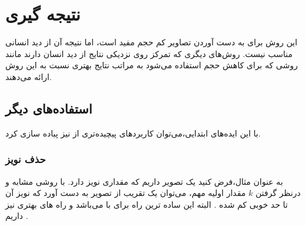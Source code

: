 \chapter{نتیجه گیری}
این روش برای به دست ‌آوردن تصاویر کم حجم مفید است، اما  نتیجه آن از دید انسانی مناسب نیست.
روش‌های دیگری که تمرکز روی نزدیکی نتایج از دید انسان دارند مانند روشی که برای کاهش حجم
استفاده می‌شود
به مراتب نتایج بهتری نسبت به این روش ارائه می‌دهند.

\section{استفاده‌های دیگر}
با این ایده‌های ابتدایی،‌می‌‌توان کاربرد‌های پیچیده‌تری از
نیز پباده سازی کرد.

\subsection{حذف نویز}

به عنوان مثال،‌فرض کنید یک تصویر داریم که مقداری نویز دارد.
با روشی مشابه و درنظر گرفتن
$k$
مقدار اولیه مهم، می‌توان یک تقریب از تصویر به دست آورد که نویز آن تا حد خوبی کم شده
\cite{7067415}
.
البته این ساده ترین راه برای
با
می‌باشد و راه ‌های بهتری نیز داریم
\cite{10.1007/978-3-030-32456-8_43}
.



